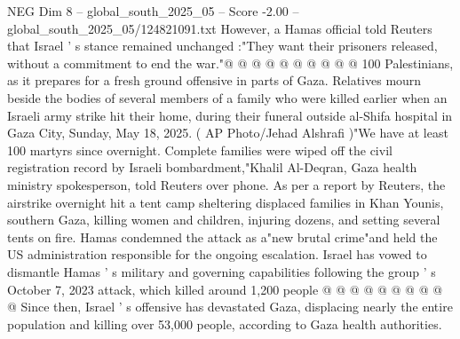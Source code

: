 \begin{textsample}{NEG Dim 8 – global\_south\_2025\_05 – Score -2.00 – global\_south\_2025\_05/124821091.txt}
However, a Hamas official told Reuters that Israel ' s stance remained unchanged :"They want their prisoners released, without a commitment to end the war."@ @ @ @ @ @ @ @ @ @ 100 Palestinians, as it prepares for a fresh ground offensive in parts of Gaza.
Relatives mourn beside the bodies of several members of a family who were killed earlier when an Israeli army strike hit their home, during their funeral outside al-Shifa hospital in Gaza City, Sunday, May 18, 2025. ( AP Photo/Jehad Alshrafi )"We have at least 100 martyrs since overnight.
Complete families were wiped off the civil registration record by Israeli bombardment,"Khalil Al-Deqran, Gaza health ministry spokesperson, told Reuters over phone.
As per a report by Reuters, the airstrike overnight hit a tent camp sheltering displaced families in Khan Younis, southern Gaza, killing women and children, injuring dozens, and setting several tents on fire.
Hamas condemned the attack as a"new brutal crime"and held the US administration responsible for the ongoing escalation.
Israel has vowed to dismantle Hamas ' s military and governing capabilities following the group ' s October 7, 2023 attack, which killed around 1,200 people @ @ @ @ @ @ @ @ @ @ Since then, Israel ' s offensive has devastated Gaza, displacing nearly the entire population and killing over 53,000 people, according to Gaza health authorities.

\end{textsample}
